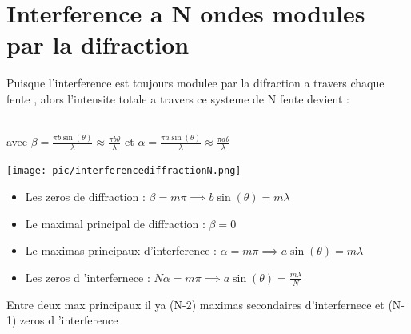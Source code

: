 \documentclass[12pt]{book}
\begin{document}
        \section{Interference a N ondes modules par la difraction}
            Puisque l'interference est toujours modulee par la difraction a travers chaque fente , alors l'intensite totale a travers ce systeme de N fente devient : \\
                \begin{center}
                    \\ 
                    avec $\beta = \frac{\pi b \sin(\theta)}{\lambda}\approx\frac{\pi b \theta}{\lambda}$ et $\alpha = \frac{\pi a \sin(\theta)}{\lambda}\approx\frac{\pi a \theta}{\lambda}$
                \end{center}
                \begin{center}
                    \begin{minipage}{0.49\linewidth}
                        \texttt{[image: pic/interferencediffractionN.png]}
                    \end{minipage}
                    \begin{minipage}{0.49\linewidth}
                        \begin{itemize}
                            \item Les zeros de diffraction : $\beta = m\pi \implies b\sin(\theta)=m\lambda$
                            \item Le maximal principal de diffraction : $\beta = 0$
                            \item Le maximas principaux d'interference : $\alpha =m\pi \implies a\sin(\theta)=m\lambda $
                            \item Les zeros d 'interfernece : $N\alpha = m\pi \implies a\sin(\theta) = \frac{m\lambda}{N}$
                        \end{itemize}
                        Entre deux max principaux il ya (N-2) maximas secondaires d'interfernece et (N-1) zeros d 'interference
                    \end{minipage}
                \end{center}
            
\end{document}
